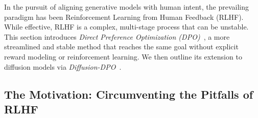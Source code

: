 

In the pursuit of aligning generative models with human intent, the prevailing paradigm has been Reinforcement Learning from Human Feedback (RLHF). While effective, RLHF is a complex, multi-stage process that can be unstable. This section introduces \emph{Direct Preference Optimization (DPO)}~\citep{rafailov2023direct}, a more streamlined and stable method that reaches the same goal without explicit reward modeling or reinforcement learning. We then outline its extension to diffusion models via \emph{Diffusion-DPO}~\citep{wallace2024diffusion}.

\subsection{The Motivation: Circumventing the Pitfalls of RLHF}

